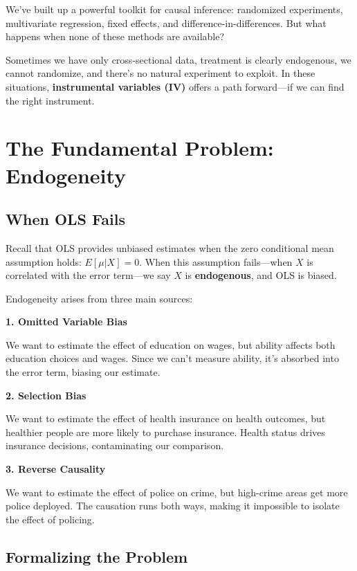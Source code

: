 \documentclass[
  letterpaper,
  DIV=11,
  numbers=noendperiod]{scrreprt}
\newcounter{none} %
\begin{document}
We've built up a powerful toolkit for causal inference: randomized
experiments, multivariate regression, fixed effects, and
difference-in-differences. But what happens when none of these methods
are available?

Sometimes we have only cross-sectional data, treatment is clearly
endogenous, we cannot randomize, and there's no natural experiment to
exploit. In these situations, \textbf{instrumental variables (IV)}
offers a path forward---if we can find the right instrument.

\section{The Fundamental Problem:
Endogeneity}\label{the-fundamental-problem-endogeneity}

\subsection{When OLS Fails}\label{when-ols-fails}

Recall that OLS provides unbiased estimates when the zero conditional
mean assumption holds: \(E[\mu | X] = 0\). When this assumption
fails---when \(X\) is correlated with the error term---we say \(X\) is
\textbf{endogenous}, and OLS is biased.

Endogeneity arises from three main sources:

\textbf{1. Omitted Variable Bias}

We want to estimate the effect of education on wages, but ability
affects both education choices and wages. Since we can't measure
ability, it's absorbed into the error term, biasing our estimate.

\textbf{2. Selection Bias}

We want to estimate the effect of health insurance on health outcomes,
but healthier people are more likely to purchase insurance. Health
status drives insurance decisions, contaminating our comparison.

\textbf{3. Reverse Causality}

We want to estimate the effect of police on crime, but high-crime areas
get more police deployed. The causation runs both ways, making it
impossible to isolate the effect of policing.

\subsection{Formalizing the Problem}\label{formalizing-the-problem}
\end{document}
